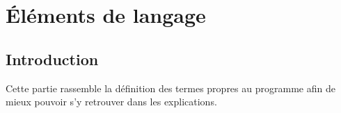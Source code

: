 % 
% 
% 
% 
% 
% 
% 
% 

\chapter{Éléments de langage}\hypertarget{langage}{}\label{langage}

\section{Introduction}\hypertarget{introduction}{}\label{introduction}

Cette partie rassemble la définition des termes propres au programme afin de mieux pouvoir s'y retrouver dans les explications.

